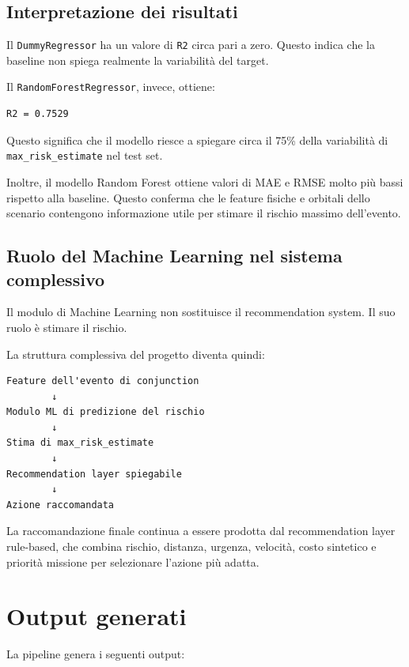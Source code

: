 \documentclass[12pt,a4paper]{article}
\begin{document}
\subsection{Interpretazione dei risultati}

Il \texttt{DummyRegressor} ha un valore di \texttt{R2} circa pari a zero. Questo indica che la baseline non spiega realmente la variabilità del target.

Il \texttt{RandomForestRegressor}, invece, ottiene:

\begin{verbatim}
R2 = 0.7529
\end{verbatim}

Questo significa che il modello riesce a spiegare circa il 75\% della variabilità di \texttt{max\_risk\_estimate} nel test set.

Inoltre, il modello Random Forest ottiene valori di MAE e RMSE molto più bassi rispetto alla baseline. Questo conferma che le feature fisiche e orbitali dello scenario contengono informazione utile per stimare il rischio massimo dell'evento.

\subsection{Ruolo del Machine Learning nel sistema complessivo}

Il modulo di Machine Learning non sostituisce il recommendation system. Il suo ruolo è stimare il rischio.

La struttura complessiva del progetto diventa quindi:

\begin{verbatim}
Feature dell'evento di conjunction
        ↓
Modulo ML di predizione del rischio
        ↓
Stima di max_risk_estimate
        ↓
Recommendation layer spiegabile
        ↓
Azione raccomandata
\end{verbatim}

La raccomandazione finale continua a essere prodotta dal recommendation layer rule-based, che combina rischio, distanza, urgenza, velocità, costo sintetico e priorità missione per selezionare l'azione più adatta.

\section{Output generati}

La pipeline genera i seguenti output:
\end{document}
